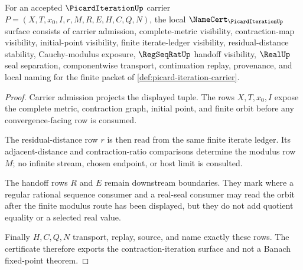 \begin{theorem}
\label{thm:picard-iteration-namecert-obligations}
For an accepted $\PicardIterationUp$ carrier $P=(X,T,x_0,I,r,M,R,E,H,C,Q,N)$, the local $\NameCert_{\PicardIterationUp}$ surface consists of carrier admission, complete-metric visibility, contraction-map visibility, initial-point visibility, finite iterate-ledger visibility, residual-distance stability, Cauchy-modulus exposure, $\RegSeqRatUp$ handoff visibility, $\RealUp$ seal separation, componentwise transport, continuation replay, provenance, and local naming for the finite packet of \autoref{def:picard-iteration-carrier}.
\end{theorem}
\begin{proof}
Carrier admission projects the displayed tuple. The rows $X,T,x_0,I$ expose the complete metric, contraction graph, initial point, and finite orbit before any convergence-facing row is consumed.

The residual-distance row $r$ is then read from the same finite iterate ledger. Its adjacent-distance and contraction-ratio comparisons determine the modulus row $M$; no infinite stream, chosen endpoint, or host limit is consulted.

The handoff rows $R$ and $E$ remain downstream boundaries. They mark where a regular rational sequence consumer and a real-seal consumer may read the orbit after the finite modulus route has been displayed, but they do not add quotient equality or a selected real value.

Finally $H,C,Q,N$ transport, replay, source, and name exactly these rows. The certificate therefore exports the contraction-iteration surface and not a Banach fixed-point theorem.
\end{proof}

